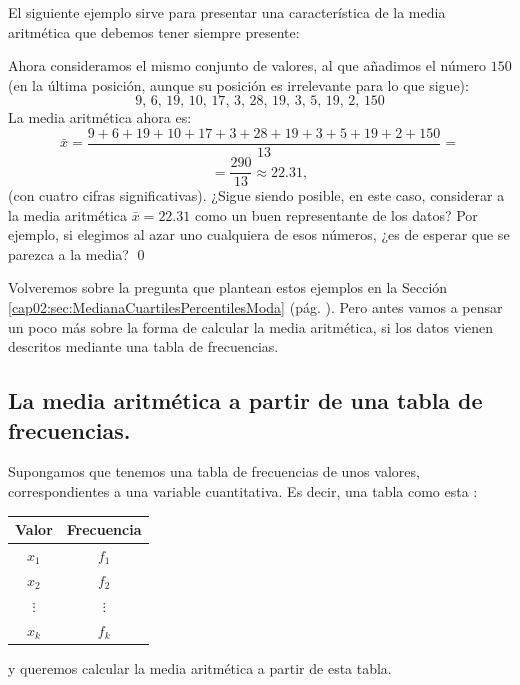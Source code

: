 El siguiente ejemplo sirve para presentar una característica de la media aritmética que debemos tener siempre presente:
\begin{ejemplo}
\label{cap02:ejem:MediaAritmetica02}
Ahora consideramos el mismo conjunto de valores, al que añadimos el número $150$ (en la última posición, aunque su posición es irrelevante para lo que sigue):
\[9,\, 6,\, 19,\, 10,\, 17,\, 3,\, 28,\, 19,\, 3,\, 5,\, 19,\, 2,\, 150\]
La media aritmética ahora es:
{\scriptsize
\[\bar x=\dfrac{9 + 6 + 19 + 10 + 17 + 3 + 28 + 19 + 3 + 5 + 19 + 2 + 150}{13}=\]
}
\[=\dfrac{290}{13}\approx 22.31,\]
(con cuatro cifras significativas). ¿Sigue siendo posible, en este caso, considerar a la media aritmética $\bar x=22.31$ como un buen representante de los datos? Por ejemplo, si elegimos al azar uno cualquiera de esos números, ¿es de esperar que se parezca a la media?
\qed
\end{ejemplo}
Volveremos sobre la pregunta que plantean estos ejemplos en la Sección \ref{cap02:sec:MedianaCuartilesPercentilesModa} (pág. \pageref{cap02:sec:MedianaCuartilesPercentilesModa}). Pero antes vamos a pensar un poco más sobre la forma de calcular la media aritmética, si los datos vienen descritos mediante una tabla de frecuencias.


\subsection{La media aritmética a partir de una tabla de frecuencias.}
\label{cap02:subsec:MediaAritmeticaAPartirTablaFrecuencias}


    Supongamos que tenemos una tabla de frecuencias de unos valores, correspondientes a una variable cuantitativa. Es decir, una tabla como esta :
   \begin{center}
        \begin{tabular}{|c|c|}
        \hline
        \rule{0cm}{4mm}{\bf Valor}&{\bf Frecuencia}\\ \hline
        \rule{0cm}{4mm}$x_1$&$f_1$\\[2mm] \hline
        \rule{0cm}{4mm}$x_2$&$f_2$\\[2mm] \hline
        $\vdots$&$\vdots$\\[2mm] \hline
        \rule{0cm}{4mm}$x_k$&$f_k$\\[2mm] \hline
        \end{tabular}
        \end{center}
   y  queremos calcular la media aritmética a partir de esta tabla.

